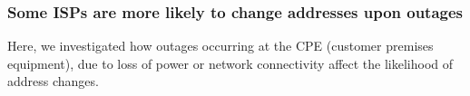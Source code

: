 \subsubsection{Some ISPs are more likely to change addresses upon
  outages}

Here, we investigated how outages occurring at the CPE (customer
premises equipment), due to loss of power or network connectivity
affect the likelihood of address changes. %







